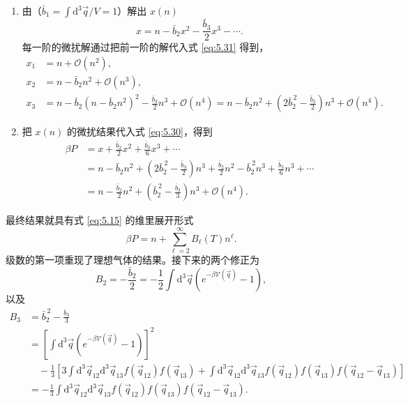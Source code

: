 \begin{enumerate}[label=(\alph*)]
\item 由（$\bar b_1=\int\mathrm{d}^3\vec q/V=1$）解出 $x(n)$
\begin{equation}\label{eq:5.31}
x=n-\bar b_2x^2-\frac{\bar b_3}{2}x^3-\cdots.
\end{equation}
每一阶的微扰解通过把前一阶的解代入式 \eqref{eq:5.31} 得到，
\begin{equation}\label{eq:5.32}
\begin{aligned}
x_1&=n+\mathcal O(n^2),\\
x_2&=n-\bar b_2n^2+\mathcal O(n^3),\\
x_3&=n-\bar b_2(n-\bar b_2n^2)^2-\frac{\bar b_3}{2}n^3+\mathcal O(n^4)=n-\bar b_2n^2+\left(2\bar b_2^{\,2}-\frac{\bar b_3}{2}\right)n^3+\mathcal O(n^4).
\end{aligned}
\end{equation}


\item 把 $x(n)$ 的微扰结果代入式 \eqref{eq:5.30}，得到
\begin{equation}\label{eq:5.33}
\begin{aligned}
\beta P&=x+\frac{\bar b_2}{2}x^2+\frac{\bar b_3}{6}x^3+\cdots\\
&=n-\bar b_2n^2+\left(2\bar b_2^{\,2}-\frac{\bar b_3}{2}\right)n^3+\frac{\bar b_2}{2}n^2-\bar b_2^{\,2}n^3+\frac{\bar b_3}{6}n^3+\cdots\\
&=n-\frac{\bar b_2}{2}n^2+\left(\bar b_2^{\,2}-\frac{\bar b_3}{3}\right)n^3+\mathcal O(n^4).
\end{aligned}
\end{equation}
\end{enumerate}

最终结果就具有式 \eqref{eq:5.15} 的维里展开形式
\begin{equation*}
\beta P=n+\sum_{\ell=2}^\infty B_\ell(T)n^\ell.
\end{equation*}
级数的第一项重现了理想气体的结果。接下来的两个修正为
\begin{equation}\label{eq:5.34}
B_2=-\frac{\bar b_2}{2}=-\frac12\int\mathrm{d}^3\vec q\left(e^{-\beta\mathscr V(\vec q)}-1\right),
\end{equation}
以及
\begin{equation}\label{eq:5.35}
\begin{aligned}
B_3&=\bar b_2^{\,2}-\frac{\bar b_3}{3}\\
&=\left[\int\mathrm{d}^3\vec q\left(e^{-\beta\mathscr V(\vec q)}-1\right)\right]^2\\
&\quad-\frac13\left[3\int\mathrm{d}^3\vec q_{12}\mathrm{d}^3\vec q_{13}f(\vec q_{12})f(\vec q_{13})+\int\mathrm{d}^3\vec q_{12}\mathrm{d}^3\vec q_{13}f(\vec q_{12})f(\vec q_{13})f(\vec q_{12}-\vec q_{13})\right]\\
&=-\frac13\int\mathrm{d}^3\vec q_{12}\mathrm{d}^3\vec q_{13}f(\vec q_{12})f(\vec q_{13})f(\vec q_{12}-\vec q_{13}).
\end{aligned}
\end{equation}

